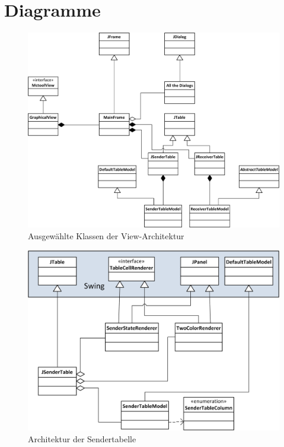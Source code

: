 \chapter{Diagramme}

    \begin{figure}
        \includegraphics[width=15cm]{images/view_architecture.png}
        \centering
        \caption{Ausgewählte Klassen der View-Architektur}
        \label{view_architecture}
    \end{figure}
    
    \begin{figure}
        \includegraphics[width=15cm]{images/JSenderTable.png}
        \centering
        \caption{Architektur der Sendertabelle}
        \label{jsendertable}
    \end{figure}
    
